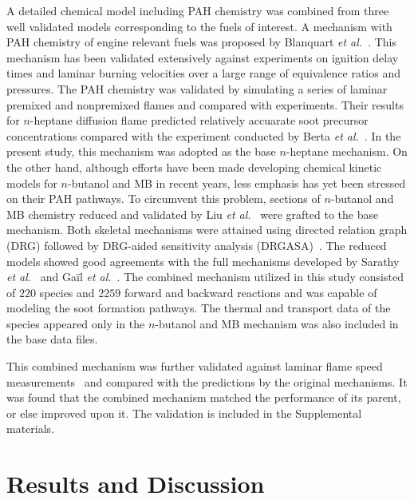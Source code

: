 \documentclass[preprint,3p,times,twocolumn]{elsarticleUS}
\begin{document}
A detailed chemical model including PAH chemistry was combined from three well validated models corresponding to the fuels of interest. A mechanism with PAH chemistry of engine relevant fuels was proposed by Blanquart \emph{et al.}~\cite{blanquart09b}. This mechanism has been validated extensively against experiments on ignition delay times and laminar burning velocities over a large range of equivalence ratios and pressures. The PAH chemistry was validated by simulating a series of laminar premixed and nonpremixed flames and compared with experiments. Their results for $n$-heptane diffusion flame predicted relatively accuarate soot precursor concentrations compared with the experiment conducted by Berta \emph{et al.}~\cite{berta06}. In the present study, this mechanism was adopted as the base $n$-heptane mechanism. On the other hand, although efforts have been made developing chemical kinetic models for $n$-butanol and MB in recent years, less emphasis has yet been stressed on their PAH pathways. To circumvent this problem, sections of $n$-butanol and MB chemistry reduced and validated by Liu \emph{et al.}~\cite{liu11} were grafted to the base mechanism. Both skeletal mechanisms were attained using directed relation graph (DRG) followed by DRG-aided sensitivity analysis (DRGASA)~\cite{lu06a,lu06b,zheng07}. The reduced models showed good agreements with the full mechanisms developed by Sarathy \emph{et al.}~\cite{sarathy09} and Ga\"il \emph{et al.}~\cite{gail08}. The combined mechanism utilized in this study consisted of $220$ species and $2259$ forward and backward reactions and was capable of modeling the soot formation pathways. The thermal and transport data of the species appeared only in the $n$-butanol and MB mechanism was also included in the base data files.

This combined mechanism was further validated against laminar flame speed measurements~\cite{liu11} and compared with the predictions by the original mechanisms. It was found that the combined mechanism matched the performance of its parent, or else improved upon it. The validation is included in the Supplemental materials.       


\section{Results and Discussion}
\end{document}
